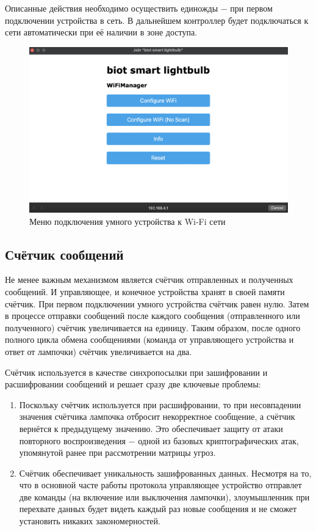 	Описанные действия необходимо осуществить единожды $-$ при первом подключении устройства в сеть.
	В дальнейшем контроллер будет подключаться к сети автоматически при её наличии в зоне доступа.
	
	\begin{figure}[H]
		\centering
		\includegraphics[scale=0.5]{resources/wifi-manager-1}
		\caption{Меню подключения умного устройства к Wi-Fi сети}
		\label{fig4.4}
	\end{figure}
	
	\subsection{Счётчик сообщений}
	
	Не менее важным механизмом является счётчик отправленных и полученных сообщений. И управляющее,
	и конечное устройства хранят в своей памяти счётчик. При первом подключении умного устройства
	счётчик равен нулю. Затем в процессе отправки сообщений после каждого сообщения (отправленного
	или полученного) счётчик увеличивается на единицу. Таким образом, после одного полного цикла
	обмена сообщениями (команда от управляющего устройства и ответ от лампочки) счётчик увеличивается
	на два.
	
	Счётчик используется в качестве синхропосылки при зашифровании и расшифровании сообщений и решает
	сразу две ключевые проблемы:
	
	\begin{enumerate}
		\item Поскольку счётчик используется при расшифровании, то при несовпадении значения счётчика 
		лампочка отбросит некорректное сообщение, а счётчик вернётся к предыдущему значению. Это обеспечивает 
		защиту от атаки повторного воспроизведения $-$ одной из базовых криптографических атак, упомянутой ранее 
		при рассмотрении матрицы угроз.
		\item Счётчик обеспечивает уникальность зашифрованных данных. Несмотря на то, что в основной часте
		работы протокола управляющее устройство отправлет две команды (на включение или выключения лампочки),
		злоумышленник при перехвате данных будет видеть каждый раз новые сообщения и не сможет установить
		никаких закономерностей.
	\end{enumerate}
	
